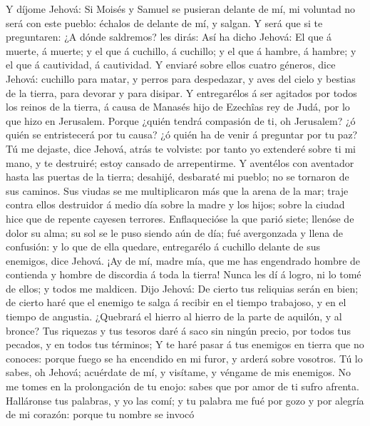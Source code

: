  Y díjome Jehová: Si Moisés y Samuel se pusieran delante
de mí, mi voluntad no será con este pueblo: échalos de delante de mí, y
salgan.  Y será que si te preguntaren: ¿A dónde saldremos?
les dirás: Así ha dicho Jehová: El que á muerte, á muerte; y el que á
cuchillo, á cuchillo; y el que á hambre, á hambre; y el que á
cautividad, á cautividad.  Y enviaré sobre ellos cuatro
géneros, dice Jehová: cuchillo para matar, y perros para despedazar, y
aves del cielo y bestias de la tierra, para devorar y para disipar.
 Y entregarélos á ser agitados por todos los reinos de la
tierra, á causa de Manasés hijo de Ezechîas rey de Judá, por lo que hizo
en Jerusalem.  Porque ¿quién tendrá compasión de ti, oh
Jerusalem? ¿ó quién se entristecerá por tu causa? ¿ó quién ha de venir á
preguntar por tu paz?  Tú me dejaste, dice Jehová, atrás
te volviste: por tanto yo extenderé sobre ti mi mano, y te destruiré;
estoy cansado de arrepentirme.  Y aventélos con aventador
hasta las puertas de la tierra; desahijé, desbaraté mi pueblo; no se
tornaron de sus caminos.  Sus viudas se me multiplicaron
más que la arena de la mar; traje contra ellos destruidor á medio día
sobre la madre y los hijos; sobre la ciudad hice que de repente cayesen
terrores.  Enflaquecióse la que parió siete; llenóse de
dolor su alma; su sol se le puso siendo aún de día; fué avergonzada y
llena de confusión: y lo que de ella quedare, entregarélo á cuchillo
delante de sus enemigos, dice Jehová.  ¡Ay de mí, madre
mía, que me has engendrado hombre de contienda y hombre de discordia á
toda la tierra! Nunca les dí á logro, ni lo tomé de ellos; y todos me
maldicen.  Dijo Jehová: De cierto tus reliquias serán en
bien; de cierto haré que el enemigo te salga á recibir en el tiempo
trabajoso, y en el tiempo de angustia.  ¿Quebrará el
hierro al hierro de la parte de aquilón, y al bronce? 
Tus riquezas y tus tesoros daré á saco sin ningún precio, por todos tus
pecados, y en todos tus términos;  Y te haré pasar á tus
enemigos en tierra que no conoces: porque fuego se ha encendido en mi
furor, y arderá sobre vosotros.  Tú lo sabes, oh Jehová;
acuérdate de mí, y visítame, y véngame de mis enemigos. No me tomes en
la prolongación de tu enojo: sabes que por amor de ti sufro afrenta.
 Halláronse tus palabras, y yo las comí; y tu palabra me
fué por gozo y por alegría de mi corazón: porque tu nombre se invocó
